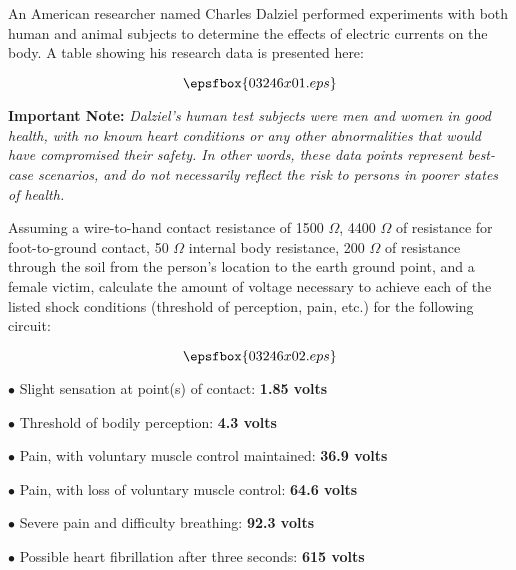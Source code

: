 

An American researcher named Charles Dalziel performed experiments with both human and animal subjects to determine the effects of electric currents on the body.  A table showing his research data is presented here:

$$\epsfbox{03246x01.eps}$$

{\bf Important Note:} {\it Dalziel's human test subjects were men and women in good health, with no known heart conditions or any other abnormalities that would have compromised their safety.  In other words, these data points represent best-case scenarios, and do not necessarily reflect the risk to persons in poorer states of health.}

\vskip 10pt

Assuming a wire-to-hand contact resistance of 1500 $\Omega$, 4400 $\Omega$ of resistance for foot-to-ground contact, 50 $\Omega$ internal body resistance, 200 $\Omega$ of resistance through the soil from the person's location to the earth ground point, and a female victim, calculate the amount of voltage necessary to achieve each of the listed shock conditions (threshold of perception, pain, etc.) for the following circuit:

$$\epsfbox{03246x02.eps}$$







\medskip
\item{$\bullet$} Slight sensation at point(s) of contact: {\bf 1.85 volts}
\item{$\bullet$} Threshold of bodily perception: {\bf 4.3 volts}
\item{$\bullet$} Pain, with voluntary muscle control maintained: {\bf 36.9 volts}
\item{$\bullet$} Pain, with loss of voluntary muscle control: {\bf 64.6 volts}
\item{$\bullet$} Severe pain and difficulty breathing: {\bf 92.3 volts}
\item{$\bullet$} Possible heart fibrillation after three seconds: {\bf 615 volts}
\medskip






